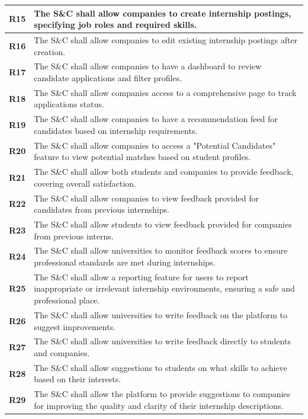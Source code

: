 \begin{longtable}{|p{}|p{}|}
    \textbf{R15} & The S\&C shall allow companies to create internship postings, specifying job roles and required skills. \\
    \hline
    \textbf{R16} & The S\&C shall allow companies to edit existing internship postings after creation. \\
    \hline

    \textbf{R17} & The S\&C shall allow companies to have a dashboard to review candidate applications and filter profiles. \\
    \hline
    \textbf{R18} & The S\&C shall allow companies access to a comprehensive page to track applications status. \\
    \hline
    \textbf{R19} & The S\&C shall allow companies to have a recommendation feed for candidates based on internship requirements. \\
    \hline
    \textbf{R20} & The S\&C shall allow companies to access a "Potential Candidates" feature to view potential matches based on student profiles. \\
    \hline

    \textbf{R21} & The S\&C shall allow both students and companies to provide feedback, covering overall satisfaction. \\
    \hline
    \textbf{R22} & The S\&C shall allow companies to view feedback provided for candidates from previous internships. \\
    \hline
    \textbf{R23} & The S\&C shall allow students to view feedback provided for companies from previous interns. \\
    \hline

    \textbf{R24} & The S\&C shall allow universities to monitor feedback scores to ensure professional standards are met during internships. \\
    \hline
    \textbf{R25} & The S\&C shall allow a reporting feature for users to report inappropriate or irrelevant internship environments, ensuring a safe and professional place. \\
    \hline
    \textbf{R26} & The S\&C shall allow universities to write feedback on the platform to suggest improvements. \\
    \hline
    \textbf{R27} & The S\&C shall allow universities to write feedback directly to students and companies. \\
    \hline
    \textbf{R28} & The S\&C shall allow suggestions to students on what skills to achieve based on their interests. \\
    \hline
    \textbf{R29} & The S\&C shall allow the platform to provide suggestions to companies for improving the quality and clarity of their internship descriptions. \\
    \hline



\end{longtable}
\newpage
